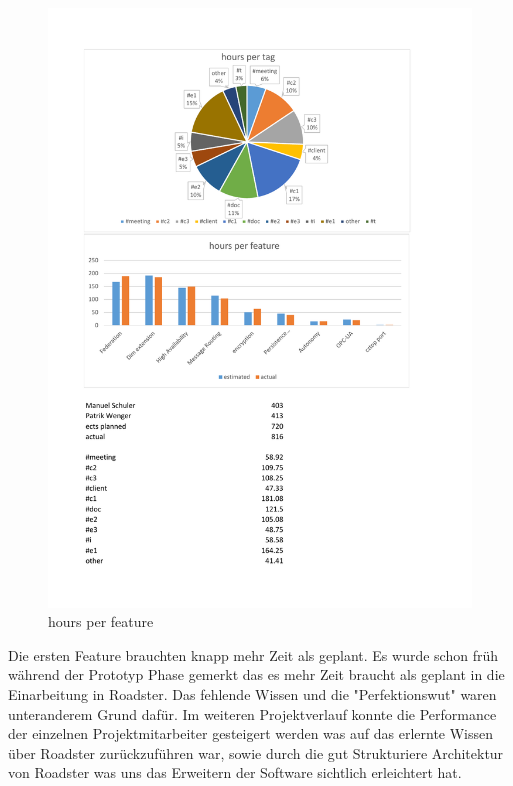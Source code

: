 \begin{figure}[]
	\includegraphics[trim=4cm 2cm 3.5cm 2.8cm, clip=true, width=\textwidth]{img/project_monitoring_diagrams.pdf}
	\caption{hours per feature}
	\label{fig:hours:per:feature}
\end{figure}

Die ersten Feature brauchten knapp mehr Zeit als geplant. Es wurde schon früh während der Prototyp Phase
gemerkt das es mehr Zeit braucht als geplant in die Einarbeitung in Roadster. Das fehlende Wissen und
die "Perfektionswut" waren unteranderem Grund dafür.
Im weiteren Projektverlauf konnte die Performance der einzelnen Projektmitarbeiter gesteigert werden
was auf das erlernte Wissen über Roadster zurückzuführen war, sowie durch die gut
Strukturiere Architektur von Roadster was uns das Erweitern der Software sichtlich erleichtert hat.


